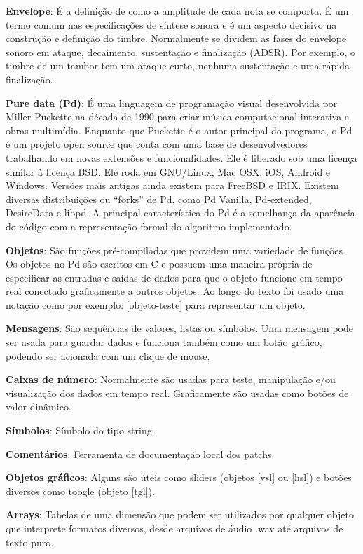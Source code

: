 \documentclass{ppgmus}
\begin{document}
\textbf{Envelope}: É a definição de como a amplitude de cada nota se comporta.
É um termo comum nas especificações de síntese sonora e é um aspecto decisivo na construção e 
definição do timbre. Normalmente se dividem as fases do
envelope sonoro em ataque, decaimento, sustentação e finalização (ADSR). Por
exemplo, o timbre de um tambor tem um ataque curto, nenhuma sustentação
e uma rápida finalização.

\textbf{Pure data (Pd)}: É uma linguagem de programação visual desenvolvida por Miller Puckette na década de 1990 
para criar música computacional interativa e obras multimídia. Enquanto que Puckette é o autor principal do programa, 
o Pd é um projeto open source que conta com uma base de desenvolvedores trabalhando em novas extensões e funcionalidades.
Ele é liberado sob uma licença similar à licença BSD. Ele roda em GNU/Linux, Mac OSX, iOS, Android e Windows. 
Versões mais antigas ainda existem para FreeBSD e IRIX. Existem diversas distribuições ou ``forks'' de Pd, como 
Pd Vanilla, Pd-extended, DesireData e libpd. A principal característica do Pd é a semelhança da aparência do código com
a representação formal do algoritmo implementado.


\textbf{Objetos}: São funções pré-compiladas que providem uma variedade de funções.
Os objetos no Pd são escritos em C e possuem uma maneira própria de especificar as entradas e saídas
de dados para que o objeto funcione em tempo-real conectado graficamente a outros objetos.
Ao longo do texto foi usado uma notação como por exemplo: [objeto-teste] para
representar um objeto.

\textbf{Mensagens}: São sequências de valores, listas ou símbolos. Uma mensagem pode ser usada para
guardar dados e funciona também como um botão gráfico, podendo ser acionada com um clique de mouse.

\textbf{Caixas de número}: Normalmente são usadas para teste, manipulação e/ou visualização
dos dados em tempo real. Graficamente são usadas como botões de valor dinâmico.

\textbf{Símbolos}: Símbolo do tipo string.

\textbf{Comentários}: Ferramenta de documentação local dos patchs.

\textbf{Objetos gráficos}: Alguns são úteis como sliders (objetos [vsl] ou [hsl])  e botões diversos como
toogle (objeto [tgl]).

\textbf{Arrays}: Tabelas de uma dimensão que podem ser utilizados por qualquer objeto
que interprete formatos diversos, desde arquivos de áudio .wav até arquivos de 
texto puro.
\end{document}
